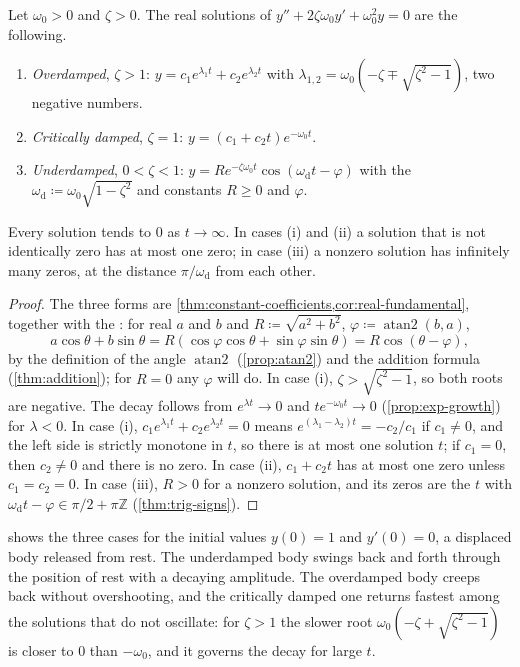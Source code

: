 \begin{proposition}
\label{prop:free-oscillations}
Let $\omega_0>0$ and $\zeta>0$. The real solutions of $y''+2\zeta\omega_0y'+\omega_0^2y=0$ are the following.
\begin{enumerate}
\item \emph{Overdamped}, $\zeta>1$: $y=c_1e^{\lambda_1t}+c_2e^{\lambda_2t}$ with $\lambda_{1,2}=\omega_0(-\zeta\mp\sqrt{\zeta^2-1})$, two negative numbers.
\item \emph{Critically damped}, $\zeta=1$: $y=(c_1+c_2t)e^{-\omega_0t}$.
\item \emph{Underdamped}, $0<\zeta<1$: $y=Re^{-\zeta\omega_0t}\cos(\omega_{\mathrm d}t-\varphi)$ with the  $\omega_{\mathrm d}\coloneqq\omega_0\sqrt{1-\zeta^2}$ and constants $R\ge0$ and $\varphi$.
\end{enumerate}
Every solution tends to $0$ as $t\to\infty$. In cases (i) and (ii) a solution that is not identically zero has at most one zero; in case (iii) a nonzero solution has infinitely many zeros, at the distance $\pi/\omega_{\mathrm d}$ from each other.
\end{proposition}

\begin{proof}
The three forms are \cref{thm:constant-coefficients,cor:real-fundamental}, together with the : for real $a$ and $b$ and $R\coloneqq\sqrt{a^2+b^2}$, $\varphi\coloneqq\operatorname{atan2}(b,a)$,
\[
a\cos\theta+b\sin\theta=R(\cos\varphi\cos\theta+\sin\varphi\sin\theta)=R\cos(\theta-\varphi),
\]
by the definition of the angle $\operatorname{atan2}$ (\cref{prop:atan2}) and the addition formula (\cref{thm:addition}); for $R=0$ any $\varphi$ will do. In case (i), $\zeta>\sqrt{\zeta^2-1}$, so both roots are negative. The decay follows from $e^{\lambda t}\to0$ and $te^{-\omega_0t}\to0$ (\cref{prop:exp-growth}) for $\lambda<0$. In case (i), $c_1e^{\lambda_1t}+c_2e^{\lambda_2t}=0$ means $e^{(\lambda_1-\lambda_2)t}=-c_2/c_1$ if $c_1\ne0$, and the left side is strictly monotone in $t$, so there is at most one solution $t$; if $c_1=0$, then $c_2\ne0$ and there is no zero. In case (ii), $c_1+c_2t$ has at most one zero unless $c_1=c_2=0$. In case (iii), $R>0$ for a nonzero solution, and its zeros are the $t$ with $\omega_{\mathrm d}t-\varphi\in\pi/2+\pi\mathbb Z$ (\cref{thm:trig-signs}).
\end{proof}

 shows the three cases for the initial values $y(0)=1$ and $y'(0)=0$, a displaced body released from rest. The underdamped body swings back and forth through the position of rest with a decaying amplitude. The overdamped body creeps back without overshooting, and the critically damped one returns fastest among the solutions that do not oscillate: for $\zeta>1$ the slower root $\omega_0(-\zeta+\sqrt{\zeta^2-1})$ is closer to $0$ than $-\omega_0$, and it governs the decay for large $t$.

